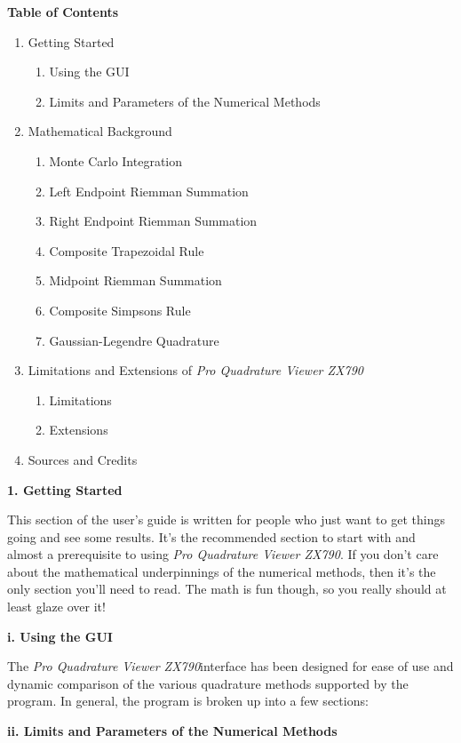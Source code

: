 \documentclass[12pt]{article}
\newcommand{\newLine}{\vspace{5mm}}
\newcommand{\appname}{\textit{Pro Quadrature Viewer ZX790}}
\newcommand{\nextsection}[1]{\newpage\noindent\Large\textbf{#1}\vspace{10mm}\normalsize}
\newcommand{\nextsubsection}[1]{\newLine \noindent \large \textbf{#1} \normalsize}
\begin{document}
 
\nextsection{Table of Contents}
\begin{enumerate}[\indent 1.]
\item Getting Started 
	\begin{enumerate}[\indent i.]
	\item Using the GUI
	\item Limits and Parameters of the Numerical Methods
	\end{enumerate}
\item Mathematical Background
	\begin{enumerate}[\indent i.]
	\item Monte Carlo Integration
	\item Left Endpoint Riemman Summation
	\item Right Endpoint Riemman Summation
	\item Composite Trapezoidal Rule
	\item Midpoint Riemman Summation
	\item Composite Simpsons Rule
	\item Gaussian-Legendre Quadrature
	\end{enumerate}
\item Limitations and Extensions of \appname
	\begin{enumerate}[\indent i.]
	\item Limitations
	\item Extensions
	\end{enumerate}
\item Sources and Credits
\end{enumerate}



\nextsection{1. Getting Started}

\newLine This section of the user's guide is written for people who just want to get things going and see some results. It's the recommended section to start with and almost a prerequisite to using \appname. If you don't care about the mathematical underpinnings of the numerical methods, then it's the only section you'll need to read. The math is fun though, so you really should at least glaze over it!

\nextsubsection{i. Using the GUI} 

\newLine The \appname interface has been designed for ease of use and dynamic comparison of the various quadrature methods supported by the program. In general, the program is broken up into a few sections:


\nextsubsection{ii. Limits and Parameters of the Numerical Methods}
\end{document}
